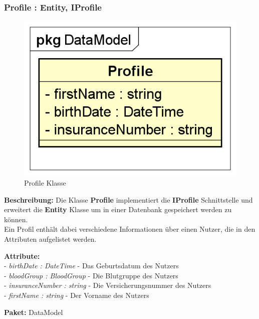 \documentclass[a4paper]{scrreprt}
\begin{document}
\subsubsection{Profile : Entity, IProfile}
\begin{figure}[H]
\centering
\includegraphics[width=0.75\textheight]{graphics/Klassendiagramme/Model/Profile.png}
\caption{Profile Klasse}
\end{figure}
\textbf{Beschreibung:} Die Klasse \textbf{Profile} implementiert die \textbf{IProfile} Schnittstelle und erweitert die \textbf{Entity} Klasse um in einer Datenbank gespeichert werden zu können.\\
Ein Profil enthält dabei verschiedene Informationen über einen Nutzer, die in den Attributen aufgelistet werden.

\textbf{Attribute:}\\
- \textit{birthDate : DateTime} - Das Geburtsdatum des Nutzers\\
- \textit{bloodGroup : BloodGroup} - Die Blutgruppe des Nutzers\\
- \textit{insuranceNumber : string} - Die Versicherungsnummer des Nutzers\\
- \textit{firstName : string} - Der Vorname des Nutzers

\textbf{Paket:} DataModel
\end{document}
